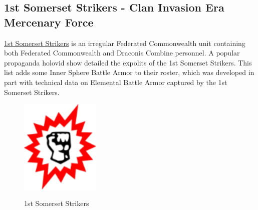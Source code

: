 \subsection{1st Somerset Strikers - Clan Invasion Era Mercenary Force}

\href{https://www.sarna.net/wiki/1st_Somerset_Strikers}{1st Somerset Strikers} is an irregular Federated Commonwealth unit containing both Federated Commonwealth and Draconis Combine  personnel.
A popular propaganda holovid show detailed the expolits of the 1st Somerset Strikers.
This list adds some Inner Sphere Battle Armor to their roster, which was developed in part with technical data on Elemental Battle Armor captured by the 1st Somerset Strikers.

\begin{figure}[!h]
  \centering
  \includegraphics[alt='1st Somerset Strikers Logo', width=1.5in, height=1.778in]{img/1st-Somerset-Strikers.png}
  \caption*{1st Somerset Strikers}
\end{figure}

